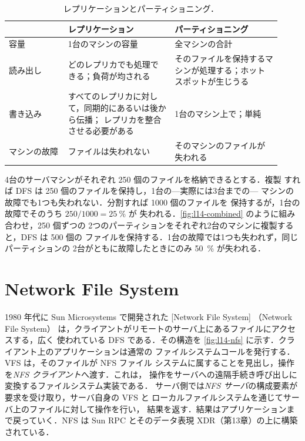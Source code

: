 \documentclass[../main.tex]{subfiles}
\begin{document}
\begin{table}[htbp]
  \centering
  \caption{レプリケーションとパーティショニング．}
  \label{tab:l14-repl}
  \small
  \begin{tabular}{@{}>{\raggedright\arraybackslash}p{0.2\linewidth}>{\raggedright\arraybackslash}p{0.36\linewidth}>{\raggedright\arraybackslash}p{0.36\linewidth}@{}}
    \toprule
    & レプリケーション & パーティショニング \\
    \midrule
    容量 & 1台のマシンの容量 & 全マシンの合計 \\
    読み出し & どのレプリカでも処理できる；負荷が均される &
      そのファイルを保持するマシンが処理する；ホットスポットが生じうる \\
    書き込み & すべてのレプリカに対して，同期的にあるいは後から伝播；
      レプリカを整合させる必要がある & 1台のマシン上で；単純 \\
    マシンの故障 & ファイルは失われない & そのマシンのファイルが失われる \\
    \bottomrule
  \end{tabular}
\end{table}

\begin{example}
  4台のサーバマシンがそれぞれ 250 個のファイルを格納できるとする．複製
  すれば DFS は 250 個のファイルを保持し，1台の---実際には3台までの---
  マシンの故障でも1つも失われない．分割すれば \num{1000} 個のファイルを
  保持するが，1台の故障でそのうち $250/1000 = \SI{25}{\percent}$ が
  失われる．\cref{fig:l14-combined} のように組み合わせ，250 個ずつの
  2つのパーティションをそれぞれ2台のマシンに複製すると，DFS は 500 個の
  ファイルを保持する．1台の故障では1つも失われず，同じパーティションの
  2台がともに故障したときにのみ \SI{50}{\percent} が失われる．
\end{example}

\section{Network File System}
\label{sec:l14-nfs}

1980 年代に Sun Microsystems で開発された [Network File System]%
（Network File System）\cite{sandberg1985}
は，クライアントがリモートのサーバ上にあるファイルにアクセスする，広く
使われている DFS である．その構造を
\cref{fig:l14-nfs} に示す．クライアント上のアプリケーションは通常の
ファイルシステムコールを発行する．VFS は，そのファイルが NFS ファイル
システムに属することを見出し，操作を\emph{NFS クライアント}へ渡す．これは，
操作をサーバへの遠隔手続き呼び出しに変換するファイルシステム実装である．
サーバ側では\emph{NFS サーバ}の構成要素が要求を受け取り，サーバ自身の VFS と
ローカルファイルシステムを通じてサーバ上のファイルに対して操作を行い，
結果を返す．結果はアプリケーションまで戻っていく．NFS は Sun RPC
 とそのデータ表現 XDR（第13章）の上に構築されている．
\end{document}
